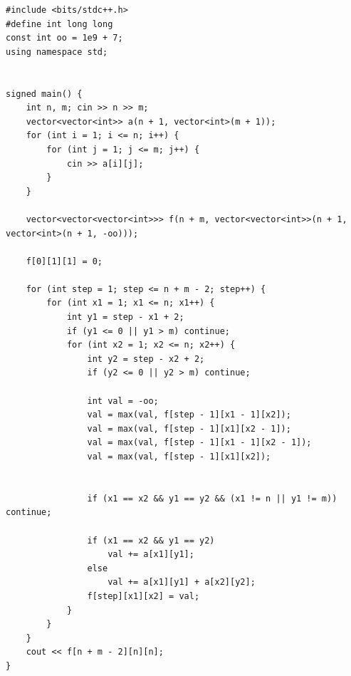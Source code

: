 \begin{lstlisting}[title=\centering\textbf{Cài đặt}]
#include <bits/stdc++.h>
#define int long long
const int oo = 1e9 + 7;
using namespace std;


signed main() {
    int n, m; cin >> n >> m;
    vector<vector<int>> a(n + 1, vector<int>(m + 1));
    for (int i = 1; i <= n; i++) {
        for (int j = 1; j <= m; j++) {
            cin >> a[i][j];
        }
    }

    vector<vector<vector<int>>> f(n + m, vector<vector<int>>(n + 1, vector<int>(n + 1, -oo)));

    f[0][1][1] = 0;

    for (int step = 1; step <= n + m - 2; step++) {
        for (int x1 = 1; x1 <= n; x1++) {
            int y1 = step - x1 + 2;
            if (y1 <= 0 || y1 > m) continue;
            for (int x2 = 1; x2 <= n; x2++) {
                int y2 = step - x2 + 2;
                if (y2 <= 0 || y2 > m) continue;

                int val = -oo;
                val = max(val, f[step - 1][x1 - 1][x2]);
                val = max(val, f[step - 1][x1][x2 - 1]);
                val = max(val, f[step - 1][x1 - 1][x2 - 1]);
                val = max(val, f[step - 1][x1][x2]); 


                if (x1 == x2 && y1 == y2 && (x1 != n || y1 != m)) continue;

                if (x1 == x2 && y1 == y2)
                    val += a[x1][y1];
                else
                    val += a[x1][y1] + a[x2][y2];
                f[step][x1][x2] = val;
            }
        }
    }
    cout << f[n + m - 2][n][n];
}
\end{lstlisting}


